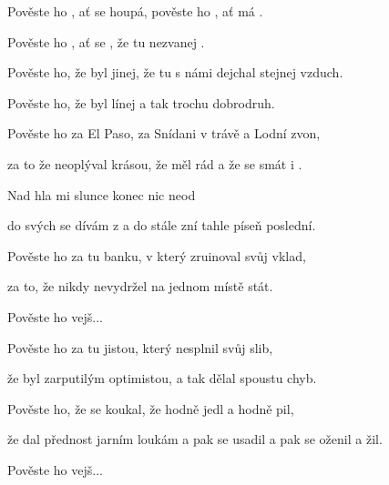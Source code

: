 
\zs

Pověste ho , ať se houpá,
pověste ho , ať má .

Pověste ho , ať se ,
že tu  nezvanej .

\ks
\zs

Pověste ho, že byl jinej,
že tu s námi dejchal stejnej vzduch.

Pověste ho, že byl línej
a tak trochu dobrodruh.

\ks
\zs

Pověste ho za El Paso,
za Snídani v trávě a Lodní zvon,

za to že neoplýval krásou,
že měl  rád a že se  smát i .

\ks
\zr

Nad hla mi slunce 
konec  nic neod

do svých  se dívám z 
a do  stále zní tahle  píseň poslední.

\kr
\zs

Pověste ho za tu banku,
v který zruinoval svůj vklad,

za to, že nikdy nevydržel
na jednom místě stát.

\ks
\zr    \kr
\zs

Pověste ho vejš...

\ks
\zs

Pověste ho za tu jistou,
který nesplnil svůj slib,

že byl zarputilým optimistou,
a tak dělal spoustu chyb.

\ks
\zs

Pověste ho, že se koukal,
že hodně jedl a hodně pil,

že dal přednost jarním loukám
a pak se usadil a pak se oženil
a žil.

\ks
\zs

Pověste ho vejš...

\ks
\kp






